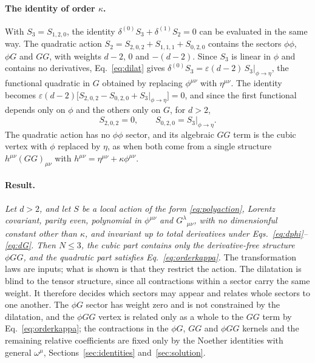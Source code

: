 \documentclass[prd,aps,preprint,nofootinbib,amsmath,amssymb,eqsecnum]{revtex4-2}
\begin{document}
\paragraph{The identity of order $\kappa$.} With $S_3=S_{1,2,0}$, the identity
$\delta^{(0)}S_3+\delta^{(1)}S_2=0$ can be evaluated in the same way. The quadratic action
$S_2=S_{2,0,2}+S_{1,1,1}+S_{0,2,0}$ contains the sectors $\phi\phi$, $\phi G$ and $GG$, with
weights $d-2$, $0$ and $-(d-2)$. Since $S_3$ is linear in $\phi$ and contains no derivatives,
Eq.~\eqref{eq:dilat} gives $\delta^{(0)}S_3=\varepsilon(d-2)\,S_3|_{\phi\to\eta}$, the
functional quadratic in $G$ obtained by replacing $\phi^{\mu\nu}$ with $\eta^{\mu\nu}$. The
identity becomes $\varepsilon(d-2)\big[S_{2,0,2}-S_{0,2,0}+S_3|_{\phi\to\eta}\big]=0$, and
since the first functional depends only on $\phi$ and the others only on $G$, for $d>2$,
\begin{equation}
S_{2,0,2}=0,\qquad S_{0,2,0}=S_3\big|_{\phi\to\eta}.
\label{eq:orderkappa}
\end{equation}
The quadratic action has no $\phi\phi$ sector, and its algebraic $GG$ term is the cubic
vertex with $\phi$ replaced by $\eta$, as when both come from a single structure
$h^{\mu\nu}(GG)_{\mu\nu}$ with $h^{\mu\nu}=\eta^{\mu\nu}+\kappa\phi^{\mu\nu}$.

\paragraph{Result.} \emph{Let $d>2$, and let $S$ be a local action of the form
\eqref{eq:polyaction}, Lorentz covariant, parity even, polynomial in $\phi^{\mu\nu}$ and
$G^{\lambda}{}_{\mu\nu}$, with no dimensionful constant other than $\kappa$, and invariant up
to total derivatives under Eqs.~\eqref{eq:dphi}--\eqref{eq:dG}. Then $N\le3$, the cubic part
contains only the derivative-free structure $\phi GG$, and the quadratic part satisfies
Eq.~\eqref{eq:orderkappa}.} The transformation laws are inputs; what is shown is that they
restrict the action. The dilatation is blind to the tensor structure, since all contractions
within a sector carry the same weight. It therefore decides which sectors may appear and
relates whole sectors to one another. The $\phi G$ sector has weight zero and is not
constrained by the dilatation, and the $\phi GG$ vertex is related only as a whole to the $GG$
term by Eq.~\eqref{eq:orderkappa}; the contractions in the $\phi G$, $GG$ and $\phi GG$ kernels
and the remaining relative coefficients are fixed only by the Noether identities with general
$\omega^\mu$, Sections~\ref{sec:identities} and~\ref{sec:solution}.
\end{document}
